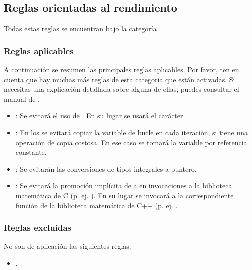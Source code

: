\subsection{Reglas orientadas al rendimiento}

Todas estas reglas se encuentran bajo la categoría .

\subsubsection{Reglas aplicables}

A continuación se resumen las principales reglas aplicables. Por favor, ten en cuenta que hay muchas más
reglas de esta categoría que están activadas. Si necesitas una explicación detallada sobre alguna de ellas,
puedes consultar el manual de .


\begin{itemize}

\item {}:
Se evitará el uso de . 
En su lugar se usará el carácter 

\item {}:
En los  se evitará copiar la variable de
bucle en cada iteración, si tiene una operación de copia costosa. En ese caso
se tomará la variable por referencia constante.

\item {}:
Se evitarán las conversiones de tipos integrales a puntero.

\item {}:
Se evitará la promoción implícita de  a  en 
invocaciones a la biblioteca matemática de C (p. ej. ).
En su lugar se invocará a la correspondiente función de la biblioteca
matemática de C++ (p. ej. .

\end{itemize}

\subsubsection{Reglas excluidas}

No son de aplicación las siguientes reglas.

\begin{itemize}

\item {}.

\end{itemize}
